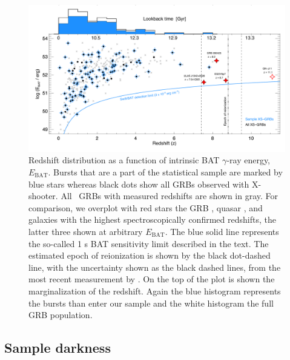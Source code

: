 \documentclass[longauth]{aa}    %
\begin{document}
\begin{figure}[!ht]
	\centering \includegraphics[width=\linewidth]{figures/XSGRB_redshift.pdf}
\caption{Redshift distribution as a function of intrinsic BAT $\gamma$-ray
	energy, $E_{\mathrm{BAT}}$. Bursts that are a part of the statistical sample
	are marked by blue stars whereas black dots show all GRBs observed with
	X-shooter. All \swift~GRBs with measured redshifts are shown in gray. For
	comparison, we overplot with red stars the GRB \citep{Tanvir2009b,
		Salvaterra2009a}, quasar \citep{Banados2017}, and galaxies \citep{Zitrin2015,
		Oesch2016} with the highest spectroscopically confirmed redshifts, the latter
	three shown at arbitrary $E_{\mathrm{BAT}}$. The blue solid line represents the
	so-called 1 s BAT sensitivity limit described in the text. The estimated epoch
	of reionization is shown by the black dot-dashed line, with the uncertainty
	shown as the black dashed lines, from the most recent measurement by
	\citet{Planck2015}. On the top of the plot is shown the marginalization of the
	redshift. Again the blue histogram represents the bursts than enter our sample
	and the white histogram the full GRB population. } \label{fig:z}
\end{figure}



\subsection{Sample darkness} \label{darkness}
\end{document}

